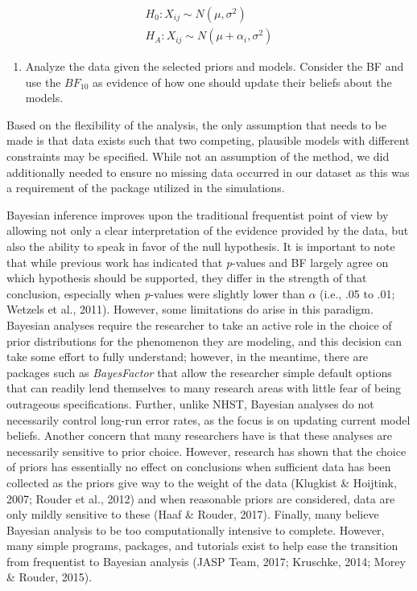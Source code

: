 \documentclass[english,man]{apa6}
\providecommand{\tightlist}{%
  \setlength{\itemsep}{0pt}\setlength{\parskip}{0pt}}
\theoremstyle{definition}
\theoremstyle{definition}
\theoremstyle{definition}
\theoremstyle{remark}
\begin{document}
\[
\begin{aligned}
  H_0: X_{ij} \sim N(\mu, \sigma^2) \\
  H_A: X_{ij} \sim N(\mu + \alpha_i, \sigma^2)
\end{aligned}
\]

\begin{enumerate}
\def\labelenumi{\arabic{enumi})}
\setcounter{enumi}{1}
\tightlist
\item
  Analyze the data given the selected priors and models. Consider the BF
  and use the \(BF_{10}\) as evidence of how one should update their
  beliefs about the models.
\end{enumerate}

Based on the flexibility of the analysis, the only assumption that needs
to be made is that data exists such that two competing, plausible models
with different constraints may be specified. While not an assumption of
the method, we did additionally needed to ensure no missing data
occurred in our dataset as this was a requirement of the package
utilized in the simulations.

Bayesian inference improves upon the traditional frequentist point of
view by allowing not only a clear interpretation of the evidence
provided by the data, but also the ability to speak in favor of the null
hypothesis. It is important to note that while previous work has
indicated that \emph{p}-values and BF largely agree on which hypothesis
should be supported, they differ in the strength of that conclusion,
especially when \emph{p}-values were slightly lower than \(\alpha\)
(i.e., .05 to .01; Wetzels et al., 2011). However, some limitations do
arise in this paradigm. Bayesian analyses require the researcher to take
an active role in the choice of prior distributions for the phenomenon
they are modeling, and this decision can take some effort to fully
understand; however, in the meantime, there are packages such as
\emph{BayesFactor} that allow the researcher simple default options that
can readily lend themselves to many research areas with little fear of
being outrageous specifications. Further, unlike NHST, Bayesian analyses
do not necessarily control long-run error rates, as the focus is on
updating current model beliefs. Another concern that many researchers
have is that these analyses are necessarily sensitive to prior choice.
However, research has shown that the choice of priors has essentially no
effect on conclusions when sufficient data has been collected as the
priors give way to the weight of the data (Klugkist \& Hoijtink, 2007;
Rouder et al., 2012) and when reasonable priors are considered, data are
only mildly sensitive to these (Haaf \& Rouder, 2017). Finally, many
believe Bayesian analysis to be too computationally intensive to
complete. However, many simple programs, packages, and tutorials exist
to help ease the transition from frequentist to Bayesian analysis (JASP
Team, 2017; Kruschke, 2014; Morey \& Rouder, 2015).
\end{document}
